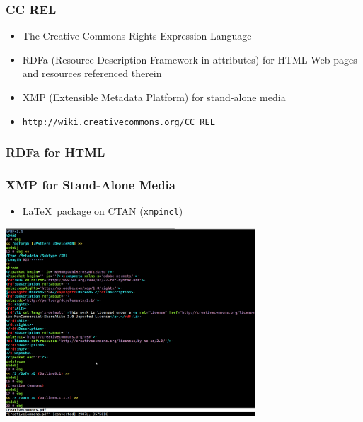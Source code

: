 \documentclass[mathserif,xcolor=dvipsnames,hyperref={bookmarks=true}]{beamer}
\begin{document}
    \begin{frame}[t]
        \frametitle{CC REL}
        \begin{itemize}
            \item The Creative Commons Rights Expression Language
            \item RDFa (Resource Description Framework in attributes) for HTML
            Web pages and resources referenced therein
            \item XMP (Extensible Metadata Platform) for stand-alone media
            \item \texttt{http://wiki.creativecommons.org/CC\_REL}
        \end{itemize}
    \end{frame}

\begin{frame}[fragile]
\frametitle{RDFa for HTML}

\end{frame}

    \begin{frame}[t]
        \frametitle{XMP for Stand-Alone Media}
        \begin{itemize}
            \item \LaTeX\ package on CTAN (\texttt{xmpincl})
        \end{itemize}
        \begin{center}
            \includegraphics[width=0.7\textwidth]{embedded_xmp.png}
        \end{center}
    \end{frame}
\end{document}
